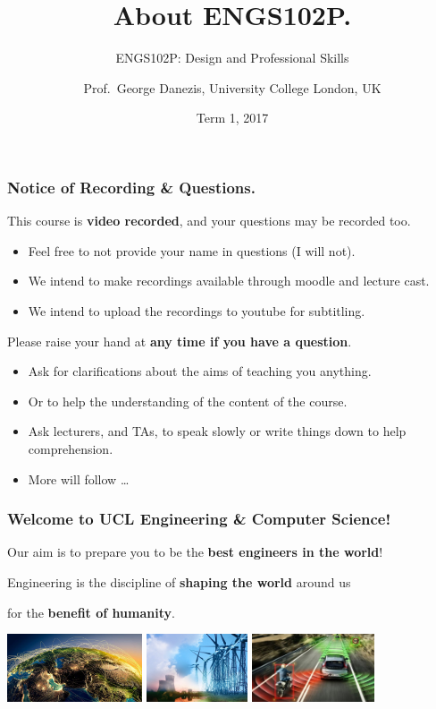 \documentclass{beamer} %
\author{Prof.\ George Danezis, University College London, UK}
\title{About ENGS102P.}
\subtitle{ENGS102P: Design and Professional Skills }
\date{Term 1, 2017}
\newcommand\emc[1]{\textcolor{brightblue}{\textbf{#1}}}
\begin{document}
\nobibliography*


\frame{
\titlepage
}

\begin{frame}
\frametitle{Notice of Recording \& Questions.}

This course is \emc{video recorded}, and your questions may be recorded too. 
\begin{itemize}
    \item Feel free to not provide your name in questions (I will not).
    \item We intend to make recordings available through moodle and lecture cast.
    \item We intend to upload the recordings to youtube for subtitling.
\end{itemize}

\vspace{3mm}
Please raise your hand at \emc{any time if you have a question}.
\begin{itemize}
    \item Ask for clarifications about the aims of teaching you anything.
    \item Or to help the understanding of the content of the course.
    \item Ask lecturers, and TAs, to speak slowly or write things down to help comprehension.
    \item More will follow \ldots
\end{itemize}

\end{frame} 


\begin{frame}
\frametitle{Welcome to UCL Engineering \& Computer Science!}

Our aim is to prepare you to be the \emc{best engineers in the world}!

\vspace{10mm}
Engineering is the discipline of \emc{shaping the world} around us 

for the \emc{benefit of humanity}.

\vspace{5mm}
\centering
\includegraphics[height=20mm]{img/internet.jpg} \quad
\includegraphics[height=20mm]{img/power.jpg} \quad
\includegraphics[height=20mm]{img/cars.jpg}

\end{frame}
\end{document}

